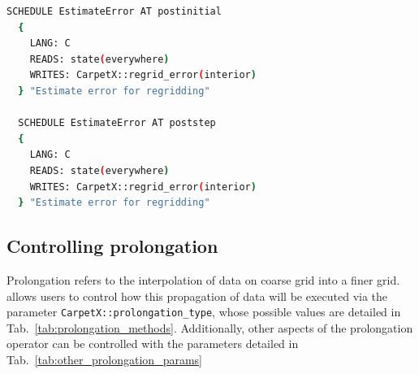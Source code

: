 \begin{lstlisting}[language=bash]
  SCHEDULE EstimateError AT postinitial
  {
    LANG: C
    READS: state(everywhere)
    WRITES: CarpetX::regrid_error(interior)
  } "Estimate error for regridding"
  
  SCHEDULE EstimateError AT poststep
  {
    LANG: C
    READS: state(everywhere)
    WRITES: CarpetX::regrid_error(interior)
  } "Estimate error for regridding"
\end{lstlisting}

\subsection{Controlling prolongation}

Prolongation refers to the interpolation of data on coarse grid into a finer grid. \CarpetX\space allows users to control how this propagation of data will be executed via the parameter \texttt{CarpetX::prolongation\_type}, whose possible values are detailed in Tab.~\ref{tab:prolongation_methods}. Additionally, other aspects of the prolongation operator can be controlled with the parameters detailed in Tab.~\ref{tab:other_prolongation_params}

